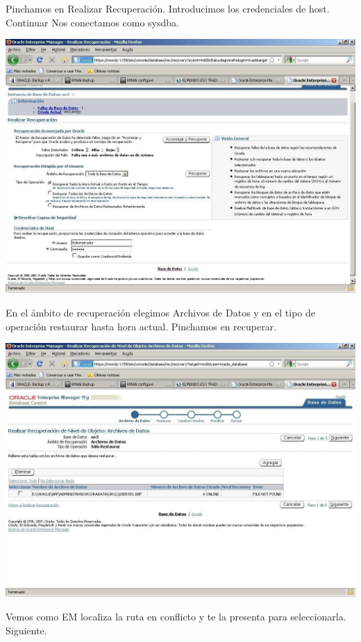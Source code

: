 \begin{enumerate}[1.]
\begin{center}
\end{center}
Pinchamos en Realizar Recuperación. Introducimos los credenciales de host. Continuar Nos conectamos como sysdba.
\begin{center}
\includegraphics[width=15cm]{./Imagenes/recu_3} 
\end{center}
En el ámbito de recuperación elegimos Archivos de Datos y en el tipo de operación restaurar hasta hora actual. Pinchamos en recuperar.
\begin{center}
\includegraphics[width=15cm]{./Imagenes/recu_4} 
\end{center} 
Vemos como EM localiza la ruta en conflicto y te la presenta para seleccionarla. Siguiente.
\begin{center}

\end{center}
\end{enumerate}
